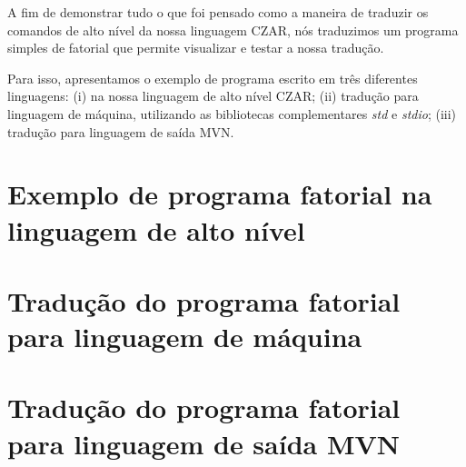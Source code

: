 
A fim de demonstrar tudo o que foi pensado como a maneira de traduzir os comandos de alto nível da nossa linguagem CZAR, nós traduzimos um programa simples de fatorial que permite visualizar e testar a nossa tradução.

Para isso, apresentamos o exemplo de programa escrito em três diferentes linguagens: (i) na nossa linguagem de alto nível CZAR; (ii) tradução para linguagem de máquina, utilizando as bibliotecas complementares \emph{std} e \emph{stdio}; (iii) tradução para linguagem de saída MVN.

\section{Exemplo de programa fatorial na linguagem de alto nível}
\label{sec:alto-nivel}



\section{Tradução do programa fatorial para linguagem de máquina}
\label{sec:traducao-asm}



\section{Tradução do programa fatorial para linguagem de saída MVN}
\label{sec:traducao-mvn}


